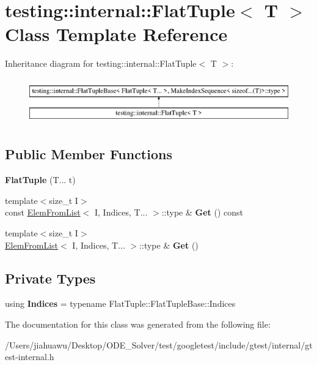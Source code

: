\hypertarget{classtesting_1_1internal_1_1_flat_tuple}{}\section{testing\+:\+:internal\+:\+:Flat\+Tuple$<$ T $>$ Class Template Reference}
\label{classtesting_1_1internal_1_1_flat_tuple}
Inheritance diagram for testing\+:\+:internal\+:\+:Flat\+Tuple$<$ T $>$\+:\begin{figure}[H]
\begin{center}
\leavevmode
\includegraphics[height=2.000000cm]{classtesting_1_1internal_1_1_flat_tuple}
\end{center}
\end{figure}
\subsection*{Public Member Functions}
\begin{DoxyCompactItemize}
\item 
\mbox{\label{classtesting_1_1internal_1_1_flat_tuple_a611d01b9ff2437e4b9cfe3bbedc6d6ae}} 
{\bfseries Flat\+Tuple} (T... t)
\item 
\mbox{\label{classtesting_1_1internal_1_1_flat_tuple_a9ea6508fa6413ceca5e38b8077c67938}} 
{\footnotesize template$<$size\+\_\+t I$>$ }\\const \mbox{\hyperlink{structtesting_1_1internal_1_1_elem_from_list}{Elem\+From\+List}}$<$ I, Indices, T... $>$\+::type \& {\bfseries Get} () const
\item 
\mbox{\label{classtesting_1_1internal_1_1_flat_tuple_a48a13560f8963f727d81a7922e3b3e50}} 
{\footnotesize template$<$size\+\_\+t I$>$ }\\\mbox{\hyperlink{structtesting_1_1internal_1_1_elem_from_list}{Elem\+From\+List}}$<$ I, Indices, T... $>$\+::type \& {\bfseries Get} ()
\end{DoxyCompactItemize}
\subsection*{Private Types}
\begin{DoxyCompactItemize}
\item 
\mbox{\label{classtesting_1_1internal_1_1_flat_tuple_a004b42fc11ac1a85a9b1560fa83cdf77}} 
using {\bfseries Indices} = typename Flat\+Tuple\+::\+Flat\+Tuple\+Base\+::\+Indices
\end{DoxyCompactItemize}


The documentation for this class was generated from the following file\+:\begin{DoxyCompactItemize}
\item 
/\+Users/jiahuawu/\+Desktop/\+O\+D\+E\+\_\+\+Solver/test/googletest/include/gtest/internal/gtest-\/internal.\+h\end{DoxyCompactItemize}
